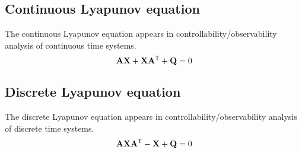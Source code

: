\subsection{Continuous Lyapunov equation}

The continuous Lyapunov equation appears in controllability/observability
analysis of continuous time systems.
\begin{equation}
  \mathbf{A}\mathbf{X} + \mathbf{X}\mathbf{A}^\mathsf{T} + \mathbf{Q} = 0
\end{equation}

\subsection{Discrete Lyapunov equation}

The discrete Lyapunov equation appears in controllability/observability analysis
of discrete time systems.
\begin{equation}
  \mathbf{A}\mathbf{X}\mathbf{A}^\mathsf{T} - \mathbf{X} + \mathbf{Q} = 0
\end{equation}
